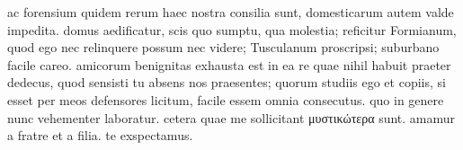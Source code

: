  ac forensium quidem rerum haec nostra consilia sunt, domesticarum autem valde impedita. domus aedificatur, scis quo sumptu, qua molestia; reficitur Formianum, quod ego nec relinquere possum nec videre; Tusculanum proscripsi; suburbano facile careo. amicorum benignitas exhausta est in ea re quae nihil habuit praeter dedecus, quod sensisti tu absens nos praesentes; quorum studiis ego et copiis, si esset per meos defensores licitum, facile essem omnia consecutus. quo in genere nunc vehementer laboratur. cetera quae me sollicitant μυστικώτερα sunt. amamur a fratre et a filia. te exspectamus.
